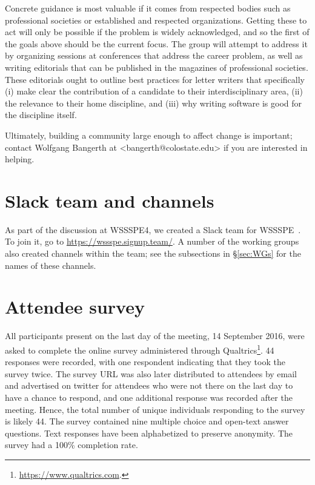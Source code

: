 \documentclass[11pt, oneside]{amsart}
\newcommand{\note}[1]{ {\textcolor{blueish}    { ***Note:      #1 }}}
\begin{document}
Concrete guidance is most valuable if it
comes from respected bodies such as professional societies or
established and respected organizations. Getting these to act
will only be possible if the problem is widely acknowledged, and so
the first of the goals above should be the current focus.
%
The group will attempt to address it by organizing sessions at conferences
that address the career problem, as well as writing editorials that
can be published in the magazines of professional societies. These
editorials ought to outline best practices for letter writers that
specifically (i) make clear the contribution of a candidate to their
interdisciplinary area, (ii) the relevance to their home discipline, and
(iii) why writing software is good for the discipline itself.

Ultimately, building a community large enough
to affect change is important; contact Wolfgang Bangerth at
<bangerth@colostate.edu> if you are interested in helping.



\section{Slack team and channels}\label{sec:slack}


As part of the discussion at WSSSPE4, we created a Slack team for WSSSPE~\cite{WSSSPESlack}.  To join it, go to \url{https://wssspe.signup.team/}.  A number of the working groups also created channels within the team; see the subsections in \S\ref{sec:WGs} for the names of these channels.


\section{Attendee survey \label{sec:survey}}


All participants present on the last day of the meeting, 14 September 2016, were asked to complete the online survey administered through Qualtrics\footnote{\url{https://www.qualtrics.com}.}.
44 responses were recorded, with one respondent indicating that they took the survey twice.
The survey URL was also later distributed to attendees by email and advertised on twitter for attendees who were not there on the last day to have a chance to respond, and one additional response was recorded after the meeting.
Hence, the total number of unique individuals responding to the survey is likely 44.
The survey contained nine multiple choice and open-text answer questions.
Text responses have been alphabetized to preserve anonymity.
The survey had a 100\% completion rate.
\end{document}

